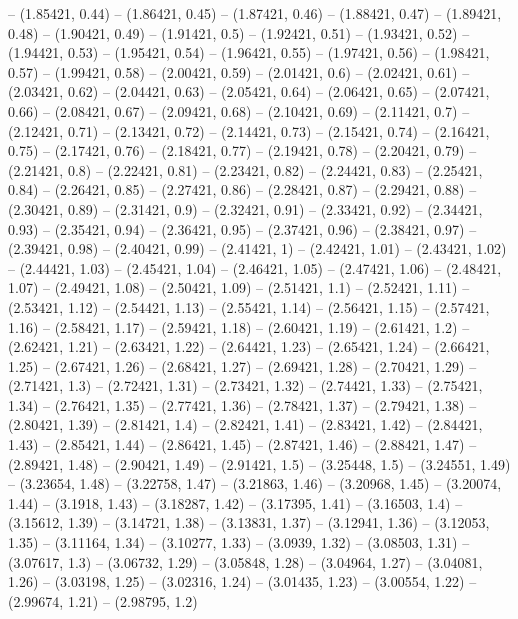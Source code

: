 -- (1.85421, 0.44)
-- (1.86421, 0.45)
-- (1.87421, 0.46)
-- (1.88421, 0.47)
-- (1.89421, 0.48)
-- (1.90421, 0.49)
-- (1.91421, 0.5)
-- (1.92421, 0.51)
-- (1.93421, 0.52)
-- (1.94421, 0.53)
-- (1.95421, 0.54)
-- (1.96421, 0.55)
-- (1.97421, 0.56)
-- (1.98421, 0.57)
-- (1.99421, 0.58)
-- (2.00421, 0.59)
-- (2.01421, 0.6)
-- (2.02421, 0.61)
-- (2.03421, 0.62)
-- (2.04421, 0.63)
-- (2.05421, 0.64)
-- (2.06421, 0.65)
-- (2.07421, 0.66)
-- (2.08421, 0.67)
-- (2.09421, 0.68)
-- (2.10421, 0.69)
-- (2.11421, 0.7)
-- (2.12421, 0.71)
-- (2.13421, 0.72)
-- (2.14421, 0.73)
-- (2.15421, 0.74)
-- (2.16421, 0.75)
-- (2.17421, 0.76)
-- (2.18421, 0.77)
-- (2.19421, 0.78)
-- (2.20421, 0.79)
-- (2.21421, 0.8)
-- (2.22421, 0.81)
-- (2.23421, 0.82)
-- (2.24421, 0.83)
-- (2.25421, 0.84)
-- (2.26421, 0.85)
-- (2.27421, 0.86)
-- (2.28421, 0.87)
-- (2.29421, 0.88)
-- (2.30421, 0.89)
-- (2.31421, 0.9)
-- (2.32421, 0.91)
-- (2.33421, 0.92)
-- (2.34421, 0.93)
-- (2.35421, 0.94)
-- (2.36421, 0.95)
-- (2.37421, 0.96)
-- (2.38421, 0.97)
-- (2.39421, 0.98)
-- (2.40421, 0.99)
-- (2.41421, 1)
-- (2.42421, 1.01)
-- (2.43421, 1.02)
-- (2.44421, 1.03)
-- (2.45421, 1.04)
-- (2.46421, 1.05)
-- (2.47421, 1.06)
-- (2.48421, 1.07)
-- (2.49421, 1.08)
-- (2.50421, 1.09)
-- (2.51421, 1.1)
-- (2.52421, 1.11)
-- (2.53421, 1.12)
-- (2.54421, 1.13)
-- (2.55421, 1.14)
-- (2.56421, 1.15)
-- (2.57421, 1.16)
-- (2.58421, 1.17)
-- (2.59421, 1.18)
-- (2.60421, 1.19)
-- (2.61421, 1.2)
-- (2.62421, 1.21)
-- (2.63421, 1.22)
-- (2.64421, 1.23)
-- (2.65421, 1.24)
-- (2.66421, 1.25)
-- (2.67421, 1.26)
-- (2.68421, 1.27)
-- (2.69421, 1.28)
-- (2.70421, 1.29)
-- (2.71421, 1.3)
-- (2.72421, 1.31)
-- (2.73421, 1.32)
-- (2.74421, 1.33)
-- (2.75421, 1.34)
-- (2.76421, 1.35)
-- (2.77421, 1.36)
-- (2.78421, 1.37)
-- (2.79421, 1.38)
-- (2.80421, 1.39)
-- (2.81421, 1.4)
-- (2.82421, 1.41)
-- (2.83421, 1.42)
-- (2.84421, 1.43)
-- (2.85421, 1.44)
-- (2.86421, 1.45)
-- (2.87421, 1.46)
-- (2.88421, 1.47)
-- (2.89421, 1.48)
-- (2.90421, 1.49)
-- (2.91421, 1.5)
-- (3.25448, 1.5)
-- (3.24551, 1.49)
-- (3.23654, 1.48)
-- (3.22758, 1.47)
-- (3.21863, 1.46)
-- (3.20968, 1.45)
-- (3.20074, 1.44)
-- (3.1918, 1.43)
-- (3.18287, 1.42)
-- (3.17395, 1.41)
-- (3.16503, 1.4)
-- (3.15612, 1.39)
-- (3.14721, 1.38)
-- (3.13831, 1.37)
-- (3.12941, 1.36)
-- (3.12053, 1.35)
-- (3.11164, 1.34)
-- (3.10277, 1.33)
-- (3.0939, 1.32)
-- (3.08503, 1.31)
-- (3.07617, 1.3)
-- (3.06732, 1.29)
-- (3.05848, 1.28)
-- (3.04964, 1.27)
-- (3.04081, 1.26)
-- (3.03198, 1.25)
-- (3.02316, 1.24)
-- (3.01435, 1.23)
-- (3.00554, 1.22)
-- (2.99674, 1.21)
-- (2.98795, 1.2)
